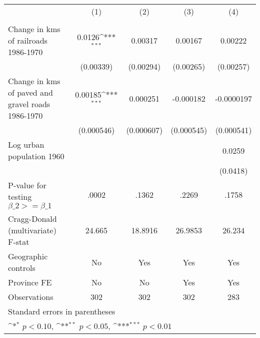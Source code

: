 {
\def\sym#1{\ifmmode^{#1}\else\(^{#1}\)\fi}
\begin{tabular}{l*{4}{c}}
\hline\hline
                &\multicolumn{1}{c}{(1)}&\multicolumn{1}{c}{(2)}&\multicolumn{1}{c}{(3)}&\multicolumn{1}{c}{(4)}\\
                &\multicolumn{1}{c}{}&\multicolumn{1}{c}{}&\multicolumn{1}{c}{}&\multicolumn{1}{c}{}\\
\hline
Change in kms of railroads 1986-1970&   0.0126\sym{***}&  0.00317         &  0.00167         &  0.00222         \\
                &(0.00339)         &(0.00294)         &(0.00265)         &(0.00257)         \\
[1em]
Change in kms of paved and gravel roads 1986-1970&  0.00185\sym{***}& 0.000251         &-0.000182         &-0.0000197         \\
                &(0.000546)         &(0.000607)         &(0.000545)         &(0.000541)         \\
[1em]
Log urban population 1960&                  &                  &                  &   0.0259         \\
                &                  &                  &                  & (0.0418)         \\
\hline
P-value for testing $\beta\_{2} >= \beta\_{1}$&    .0002         &    .1362         &    .2269         &    .1758         \\
Cragg-Donald (multivariate) F-stat&   24.665         &  18.8916         &  26.9853         &   26.234         \\
Geographic controls&       No         &      Yes         &      Yes         &      Yes         \\
Province FE     &       No         &       No         &      Yes         &      Yes         \\
Observations    &      302         &      302         &      302         &      283         \\
\hline\hline
\multicolumn{5}{l}{\footnotesize Standard errors in parentheses}\\
\multicolumn{5}{l}{\footnotesize \sym{*} \(p<0.10\), \sym{**} \(p<0.05\), \sym{***} \(p<0.01\)}\\
\end{tabular}
}
